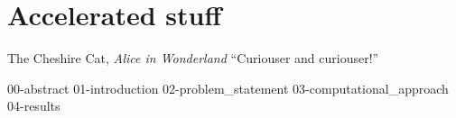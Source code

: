 \chapter{\label{ch:accelerator}Accelerated stuff}

\begin{frontquote}{The Cheshire Cat, \emph{Alice in Wonderland}}
  ``Curiouser and curiouser!''
\end{frontquote}

{00-abstract}
{01-introduction}
{02-problem_statement}
{03-computational_approach}
{04-results}

